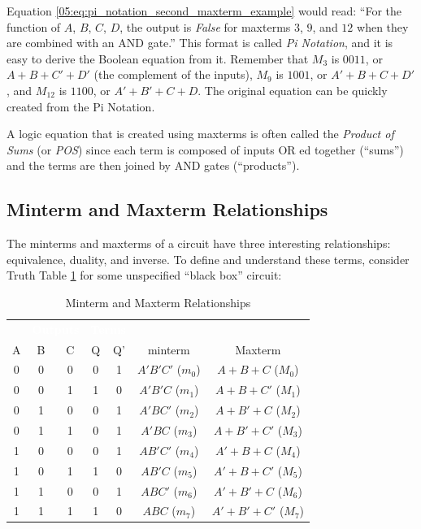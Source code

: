 Equation \ref{05:eq:pi_notation_second_maxterm_example} would read: ``For the function of  $ A $,  $ B $,  $ C $,  $ D $, the output is \emph{False} for maxterms $ 3 $, $ 9 $, and $ 12 $ when they are combined with an \textsf{AND}  gate.'' This format is called \emph{Pi Notation}, and it is easy to derive the Boolean equation from it. Remember that $ M_3 $ is $ 0011 $, or $ A+B+C'+D' $ (the complement of the inputs), $ M_9 $ is $ 1001 $, or $ A'+B+C+D' $, and $ M_{12} $ is $ 1100 $, or $ A'+B'+C+D $. The original equation can be quickly created from the Pi Notation. 

A logic equation that is created using maxterms is often called the \emph{Product of Sums} (or \emph{POS}) since each term is composed of inputs \textsf{OR} ed together (``sums'') and the terms are then joined by \textsf{AND}  gates (``products'').

\subsection{Minterm and Maxterm Relationships}
\label{05:subsec:minterm_and_maxterm_relationships}

The minterms and maxterms of a circuit have three interesting relationships: equivalence, duality, and inverse. To define and understand these terms, consider Truth Table \ref{05:tab:minterm_and_maxterm_relationships_truth_table} for some unspecified ``black box'' circuit: 

\begin{table}[H]
  \sffamily
  \newcommand{\head}[1]{\textcolor{white}{\textbf{#1}}}    
  \begin{center}
    \begin{tabular}{ccc|cc|cc} 
      \rowcolor{black!75}
      \multicolumn{3}{c}{\head{Inputs}} & \multicolumn{2}{c}{\head{Outputs}} & \multicolumn{2}{c}{\head{Terms}} \\
      A & B & C & Q & Q' & minterm & Maxterm \\
      \hline
      0 & 0 & 0 & 0 & 1 & $ A'B'C' $ ($ m_0 $) & $ A+B+C $    ($ M_0 $) \\
      0 & 0 & 1 & 1 & 0 & $ A'B'C $  ($ m_1 $) & $ A+B+C' $   ($ M_1 $) \\
      0 & 1 & 0 & 0 & 1 & $ A'BC' $  ($ m_2 $) & $ A+B'+C $   ($ M_2 $) \\
      0 & 1 & 1 & 0 & 1 & $ A'BC $   ($ m_3 $) & $ A+B'+C' $  ($ M_3 $) \\
      1 & 0 & 0 & 0 & 1 & $ AB'C' $  ($ m_4 $) & $ A'+B+C $   ($ M_4 $) \\
      1 & 0 & 1 & 1 & 0 & $ AB'C $   ($ m_5 $) & $ A'+B+C' $  ($ M_5 $) \\
      1 & 1 & 0 & 0 & 1 & $ ABC' $   ($ m_6 $) & $ A'+B'+C $  ($ M_6 $) \\
      1 & 1 & 1 & 1 & 0 & $ ABC $    ($ m_7 $) & $ A'+B'+C' $ ($ M_7 $) 
    \end{tabular}
  \end{center}
  \caption{Minterm and Maxterm Relationships}
  \label{05:tab:minterm_and_maxterm_relationships_truth_table}
\end{table}

